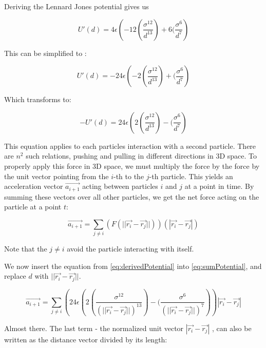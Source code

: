 \documentclass[a4paper,10pt,english]{article}
\begin{document}
Deriving the Lennard Jones potential gives us

\begin{equation}
U'(d) = 4\epsilon \left( -12  (\frac{\sigma^{12}}{d^{13}}) + 6 (\frac{\sigma^6}{d^7 } \right)
\end{equation}

This can be simplified to :

\begin{equation}
U'(d) = -24\epsilon \left( -2  (\frac{\sigma^{12}}{d^{13}}) + (\frac{\sigma^6}{d^7 } \right)
\end{equation}

Which transforms to:

\begin{equation}
-U'(d) = 24\epsilon \left( 2  (\frac{\sigma^{12}}{d^{13}}) - (\frac{\sigma^6}{d^7 } \right)
\label{eq:derivedPotential}
\end{equation}


This equation applies to each particles interaction with a second particle. There are $n^2$ such relations, pushing and pulling in different directions in 3D space. To properly apply this force in 3D space, we must multiply the force by the force by the unit vector pointing from the $i$-th to the $j$-th particle. This yields an acceleration vector $\vec{a_{i+1}}$ acting between particles $i$ and $j$ at a point in time. By summing these vectors over all other particles, we get the net force acting on the particle at a point $t$:

\begin{equation}
\vec{a_{i+1}} =   \sum_{j \neq i}  \left(  F(||\vec{r_i} - \vec{r_j} ||) \right)( |\vec{r_i} - \vec{r_j} |)
\label{eq:sumPotential}
\end{equation}

Note that the $j \neq i$ avoid the particle interacting with itself.

We now insert the equation from \eqref{eq:derivedPotential} into \eqref{eq:sumPotential}, and replace $d$ with $||\vec{r_i} - \vec{r_j} ||$.


\begin{equation}
\vec{a_{i+1}} =   \sum_{j \neq i}  \left(  
24\epsilon \left( 2  (\frac{\sigma^{12}}{(||\vec{r_i} - \vec{r_j} ||)^{13}}) 
- (\frac{\sigma^6}{(||\vec{r_i} - \vec{r_j} ||)^7 } \right)\right)|\vec{r_i} - \vec{r_j} |
\label{eq:sumPotential}
\end{equation}

Almost there.  The last term - the normalized  unit vector $|\vec{r_i} - \vec{r_j} |$ , can also be written as the distance vector divided by its length:
\end{document}
